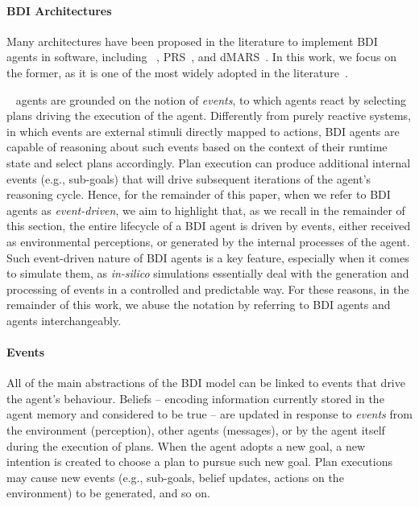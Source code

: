 \paragraph{\ac{BDI} Architectures}
\label{ssec:computational-bdi}

Many architectures have been proposed in the literature to implement \ac{BDI} agents in software,
including \agentspeak{}~\cite{RaoG95},
\ac{PRS}~\cite{IngrandGR1992},
and \ac{dMARS}~\cite{DInvernoLGKW04}.
%
In this work,
we focus on the former,
as it is one of the most widely adopted in the literature~\cite{CalegariCMO21,computers10020016}.

\agentspeak{}~\cite{RaoG95} agents are grounded on the notion of \emph{events},
to which agents react by selecting plans driving the execution of the agent.
Differently from purely reactive systems,
in which events are external stimuli directly mapped to actions,
\ac{BDI} agents are capable of reasoning about such events based on the context of their runtime state
and select plans accordingly.
%
Plan execution can produce additional internal events
(e.g., sub-goals)
that will drive subsequent iterations of the agent's reasoning cycle.
%
Hence, for the remainder of this paper, when we refer to \ac{BDI} agents as \emph{event-driven},
we aim to highlight that,
as we recall in the remainder of this section,
the entire lifecycle of a \ac{BDI} agent is driven by events,
either received as environmental perceptions,
or generated by the internal processes of the agent.
%
Such event-driven nature of \ac{BDI} agents is a key feature,
especially when it comes to simulate them,
as \emph{in-silico} simulations essentially deal with the generation and processing of events
in a controlled and predictable way.
%
For these reasons,
in the remainder of this work,
we abuse the notation by referring to \ac{BDI} agents and \agentspeak{} agents interchangeably.

\paragraph{Events}
\label{ssec:bdi-events}

All of the main abstractions of the \ac{BDI} model can be linked to events that drive the agent's behaviour.
Beliefs -- encoding information currently stored in the agent memory and considered to be true -- are updated in response to \emph{events} from the environment (perception), other agents (messages),
or by the agent itself during the execution of plans. %
%
When the agent adopts a new goal,
a new intention is created to choose a plan to pursue such new goal.
%
Plan executions may cause new events
(e.g., sub-goals, belief updates, actions on the environment)
to be generated, and so on.

